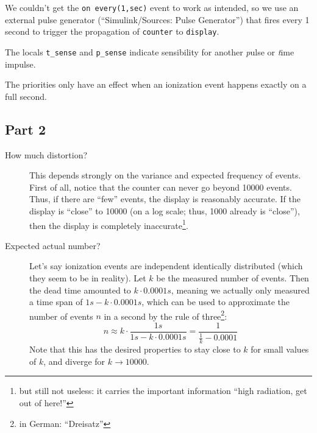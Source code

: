 \documentclass[a4paper,parskip,headheight=38pt]{scrartcl} %
\begin{document}
We couldn't get the \texttt{on every(1,sec)} event to work as intended,
so we use an external pulse generator (\enquote{Simulink/Sources: Pulse
Generator}) that fires every 1 second to trigger the propagation of
\texttt{counter} to \texttt{display}.

The locals \texttt{t\_sense} and \texttt{p\_sense} indicate  sensibility for
another \emph{p}ulse or \emph{t}ime impulse.

The priorities only have an effect when an ionization event
happens exactly on a full second.

 \pagebreak{}
\subsection*{Part 2}

\begin{description}
    \item[How much distortion?] This depends strongly on the variance and
    expected frequency of events.  First of all, notice that the
    counter can never go beyond 10000 events.  Thus, if
    there are \enquote{few} events, the display is reasonably accurate.
    If the display is \enquote{close} to 10000 (on a log
    scale; thus, 1000 already is \enquote{close}), then the
    display is completely inaccurate\footnote{but still not useless: it
    carries the important information \enquote{high radiation, get out
    of here!}}.
    \item[Expected actual number?] Let's say ionization events are
    independent identically distributed (which they seem to be in
    reality).  Let $k$ be the measured number of events.  Then the dead
    time amounted to $k \cdot 0.0001 s$, meaning we actually only
    measured a time span of $1 s - k \cdot 0.0001 s$, which can be used
    to approximate the number of events $n$ in a second by the rule of
    three\footnote{in German: \enquote{Dreisatz}}:
        \[ n \approx k \cdot \frac{1 s}{1 s - k \cdot 0.0001 s}
             = \frac{1}{\frac{1}{k} - 0.0001}\]
    Note that this has the desired properties to stay close to $k$ for
    small values of $k$, and diverge for $k \to 10000$.
\end{description}
\end{document}
